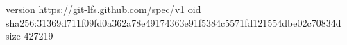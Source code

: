 version https://git-lfs.github.com/spec/v1
oid sha256:31369d711f09fd0a362a78e49174363e91f5384c5571fd121554dbe02c70834d
size 427219
